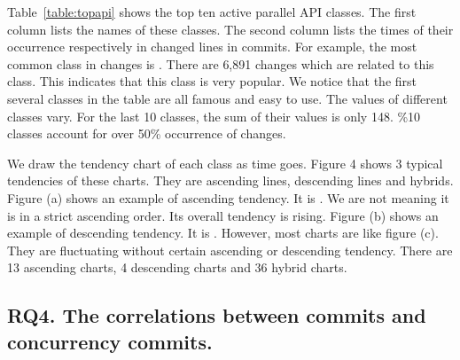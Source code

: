 Table~\ref{table:topapi} shows the top ten active parallel API classes. The first column lists the names of these classes. The second column lists the times of their occurrence respectively in changed lines in commits. For example, the most common class in changes is . There are 6,891 changes which are related to this class. This indicates that this class is very popular. We notice that the first several classes in the table are all famous and easy to use. The values of different classes vary. For the last 10 classes, the sum of their values is only 148. \%10 classes account for over 50\% occurrence of changes.

We draw the tendency chart of each class as time goes. Figure 4 shows 3 typical tendencies of these charts. They are ascending lines, descending lines and hybrids. Figure (a) shows an example of ascending tendency. It is . We are not meaning it is in a strict ascending order. Its overall tendency is rising. Figure (b) shows an example of descending tendency. It is . However, most charts are like figure (c). They are fluctuating without certain ascending or descending tendency. There are 13 ascending charts, 4 descending charts and 36 hybrid charts.



\subsection{RQ4. The correlations between commits and concurrency commits.}

